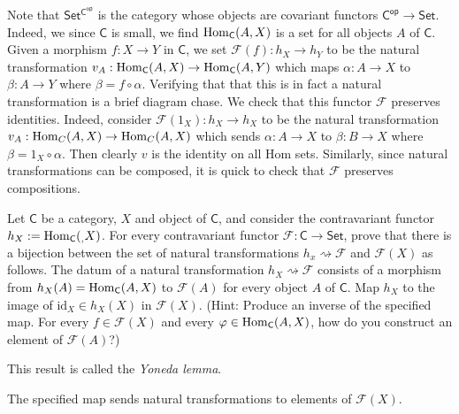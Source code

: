 \documentclass[../../master.tex]{subfiles}
\begin{document}
\begin{solution}
    Note that $\mathsf{Set^{C^{op}}}$ is the category whose objects are covariant functors $\mathsf{C^{op}} \to \mathsf{Set}$.
    Indeed, we since $\mathsf{C}$ is small, we find $\operatorname{Hom}_{\mathsf{C}}(A, X)$ is a set for all objects $A$ of $\mathsf{C}$.
    Given a morphism $f: X \to Y$ in $\mathsf{C}$, we set $\mathscr{F}(f):h_X \to h_Y$ to be the natural transformation $v_A: \operatorname{Hom}_{\mathsf{C}}(A, X) \to \operatorname{Hom}_{\mathsf{C}}(A, Y)$ which maps $\alpha: A \to X$ to $\beta: A \to Y$ where $\beta = f \circ \alpha$.
    Verifying that that this is in fact a natural transformation is a brief diagram chase.
    We check that this functor $\mathscr{F}$ preserves identities.
    Indeed, consider $\mathscr{F}(1_X) : h_X \to h_X$ to be the natural transformation $v_A: \operatorname{Hom}_C(A, X) \to \operatorname{Hom}_C(A, X)$ which sends $\alpha: A \to X$ to $\beta: B \to X$ where $\beta = 1_X \circ \alpha$.
    Then clearly $v$ is the identity on all Hom sets.
    Similarly, since natural transformations can be composed, it is quick to check that $\mathscr{F}$ preserves compositions.
\end{solution}

\begin{problem}
    Let $\mathsf{C}$ be a category, $X$ and object of $\mathsf{C}$, and consider the contravariant functor $h_X := \operatorname{Hom}_{\mathsf{C}}(_, X)$.
    For every contravariant functor $\mathscr{F} : \mathsf{C} \to \mathsf{Set}$, prove that there is a bijection between the set of natural transformations $h_x \rightsquigarrow \mathscr{F}$ and $\mathscr{F}(X)$ as follows.
    The datum of a natural transformation $h_X \rightsquigarrow \mathscr{F}$ consists of a morphism from $h_X(A) = \operatorname{Hom}_{\mathsf{C}}(A, X)$ to $\mathscr{F}(A)$ for every object $A$ of $\mathsf{C}$.
    Map $h_X$ to the image of $\text{id}_X \in h_X(X)$ in $\mathscr{F}(X)$.
    (Hint: Produce an inverse of the specified map.
    For every $f \in \mathscr{F}(X)$ and every $\varphi \in \operatorname{Hom}_{\mathsf{C}}(A, X)$, how do you construct an element of $\mathscr{F}(A)$?)

    This result is called the \textit{Yoneda lemma}.
\end{problem}

\begin{solution}
    The specified map sends natural transformations to elements of $\mathscr{F}(X)$.
\end{solution}
\end{document}
